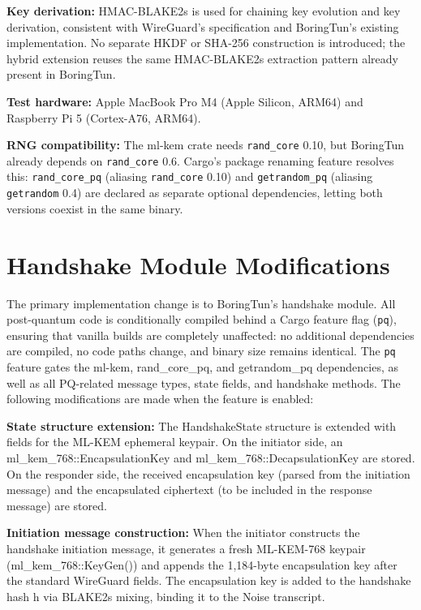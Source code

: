 \textbf{Key derivation:} HMAC-BLAKE2s is used for chaining key evolution and key derivation, consistent with WireGuard's specification and BoringTun's existing implementation. No separate HKDF or SHA-256 construction is introduced; the hybrid extension reuses the same HMAC-BLAKE2s extraction pattern already present in BoringTun.

\textbf{Test hardware:} Apple MacBook Pro M4 (Apple Silicon, ARM64) and Raspberry Pi 5 (Cortex-A76, ARM64).

\textbf{RNG compatibility:} The ml-kem crate needs \texttt{rand\_core} 0.10, but BoringTun already depends on \texttt{rand\_core} 0.6. Cargo's package renaming feature resolves this: \texttt{rand\_core\_pq} (aliasing \texttt{rand\_core} 0.10) and \texttt{getrandom\_pq} (aliasing \texttt{getrandom} 0.4) are declared as separate optional dependencies, letting both versions coexist in the same binary.

\section{Handshake Module Modifications}

The primary implementation change is to BoringTun's handshake module. All post-quantum code is conditionally compiled behind a Cargo feature flag (\texttt{pq}), ensuring that vanilla builds are completely unaffected: no additional dependencies are compiled, no code paths change, and binary size remains identical. The \texttt{pq} feature gates the ml-kem, rand\_core\_pq, and getrandom\_pq dependencies, as well as all PQ-related message types, state fields, and handshake methods. The following modifications are made when the feature is enabled:

\textbf{State structure extension:} The HandshakeState structure is extended with fields for the ML-KEM ephemeral keypair. On the initiator side, an ml\_kem\_768::EncapsulationKey and ml\_kem\_768::DecapsulationKey are stored. On the responder side, the received encapsulation key (parsed from the initiation message) and the encapsulated ciphertext (to be included in the response message) are stored.

\textbf{Initiation message construction:} When the initiator constructs the handshake initiation message, it generates a fresh ML-KEM-768 keypair (ml\_kem\_768::KeyGen()) and appends the 1,184-byte encapsulation key after the standard WireGuard fields. The encapsulation key is added to the handshake hash h via BLAKE2s mixing, binding it to the Noise transcript.

